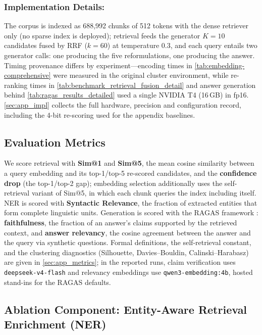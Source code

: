 \documentclass[11pt]{article}
\begin{document}
\subsubsection{Implementation Details:} The corpus is indexed as 688{,}992 chunks of 512 tokens with the dense retriever only (no sparse index is deployed); retrieval feeds the generator \(K=10\) candidates fused by RRF (\(k=60\)) at temperature 0.3, and each query entails two generator calls: one producing the five reformulations, one producing the answer. Timing provenance differs by experiment---encoding times in \cref{tab:embedding-comprehensive} were measured in the original cluster environment, while re-ranking times in \cref{tab:benchmark_retrieval_fusion_detail} and answer generation behind \cref{tab:ragas_results_detailed} used a single NVIDIA T4 (16\,GB) in fp16. \cref{sec:app_impl} collects the full hardware, precision and configuration record, including the 4-bit re-scoring used for the appendix baselines.

\subsection{Evaluation Metrics}
\label{subsec:metrics}

We score retrieval with \textbf{Sim@1} and \textbf{Sim@5}, the mean cosine similarity between a query embedding and its top-1/top-5 re-scored candidates, and the \textbf{confidence drop} (the top-1/top-2 gap); embedding selection additionally uses the self-retrieval variant of Sim@5, in which each chunk queries the index including itself. NER is scored with \textbf{Syntactic Relevance}, the fraction of extracted entities that form complete linguistic units. Generation is scored with the RAGAS framework \citep{es2024ragas}: \textbf{faithfulness}, the fraction of an answer's claims supported by the retrieved context, and \textbf{answer relevancy}, the cosine agreement between the answer and the query via synthetic questions. Formal definitions, the self-retrieval constant, and the clustering diagnostics (Silhouette, Davies--Bouldin, Calinski--Harabasz) are given in \cref{sec:app_metrics}; in the reported runs, claim verification uses \texttt{deepseek-v4-flash} and relevancy embeddings use \texttt{qwen3-embedding:4b}, hosted stand-ins for the RAGAS defaults.

\subsection{Ablation Component: Entity-Aware Retrieval Enrichment (NER)}
\label{subsec:exp_ner}
\end{document}
